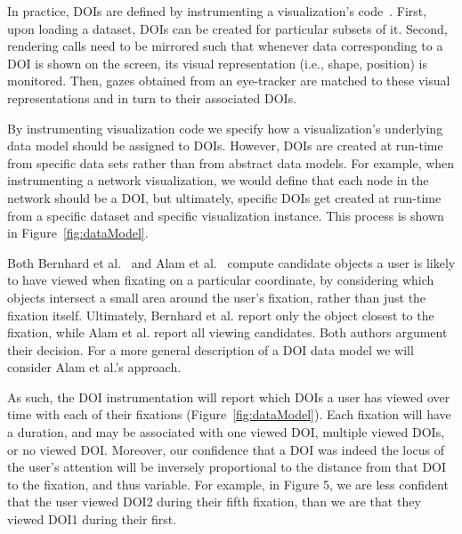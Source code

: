 In practice, DOIs are defined by instrumenting a visualization's code~\cite{alam15analyzing}. First, upon loading a dataset, DOIs can be created for particular subsets of it. Second, rendering calls need to be mirrored such that whenever data corresponding to a DOI is shown on the screen, its visual representation (i.e., shape, position) is monitored. Then, gazes obtained from an eye-tracker are matched to these visual representations and in turn to their associated DOIs. 

By instrumenting visualization code we specify how a visualization's underlying data model should be assigned to DOIs. However, DOIs are created at run-time from specific data sets rather than from abstract data models. For example, when instrumenting a network visualization, we would define that each node in the network should be a DOI, but ultimately, specific DOIs get created at run-time from a specific dataset and specific visualization instance. This process is shown in Figure~\ref{fig:dataModel}.

Both Bernhard et al.~\cite{bernhard2014gaze} and Alam et al.~\cite{alam15analyzing} compute candidate objects a user is likely to have viewed when fixating on a particular coordinate, by considering which objects intersect a small area around the user's fixation, rather than just the fixation itself. Ultimately, Bernhard et al. report only the object closest to the fixation, while Alam et al. report all viewing candidates.  Both authors argument their decision. For a more general description of a DOI data model we will consider Alam et al.'s approach. 

As such, the DOI instrumentation will report which DOIs a user has viewed over time with each of their fixations (Figure~\ref{fig:dataModel}). Each fixation will have a duration, and may be associated with one viewed DOI, multiple viewed DOIs, or no viewed DOI. Moreover, our confidence that a DOI was indeed the locus of the user's attention will be inversely proportional to the distance from that DOI to the fixation, and thus variable. For example, in Figure 5, we are less confident that the user viewed DOI2 during their fifth fixation, than we are that they viewed DOI1 during their first.  

